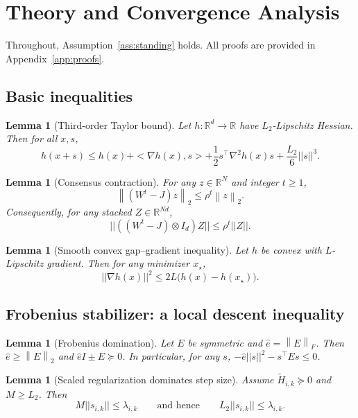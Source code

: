 \documentclass[11pt,a4paper]{article}
\def\one{1}%
\def\J{J}%
\def\norm#1{||#1||}%
\def\ip#1#2{<#1,#2>}%
\newtheorem{lemma}[theorem]{Lemma}
\newcommand{\R}{\mathbb{R}}
\newcommand{\one}{\mathbf{1}}
\newcommand{\ip}[2]{\left\langle #1,#2\right\rangle}
\newcommand{\norm}[1]{\left\|#1\right\|}
\newcommand{\normtwo}[1]{\left\|#1\right\|_2}
\newcommand{\normF}[1]{\left\|#1\right\|_F}
\newcommand{\J}{\left(\frac{1}{N}\one\one^\top\right)}
\begin{document}
	\section{Theory and Convergence Analysis}\label{sec:theory}
	Throughout, Assumption~\ref{ass:standing} holds.
	All proofs are provided in Appendix~\ref{app:proofs}.
	
	\subsection{Basic inequalities}
	\begin{lemma}[Third-order Taylor bound]\label{lem:taylor3}
		Let $h:\R^d\to\R$ have $L_2$-Lipschitz Hessian. Then for all $x,s$,
		\[
		h(x+s)\le h(x)+\ip{\nabla h(x)}{s}+\frac12 s^\top\nabla^2 h(x)s+\frac{L_2}{6}\norm{s}^3.
		\]
	\end{lemma}
	
	\begin{lemma}[Consensus contraction]\label{lem:consensus}
		For any $z\in\R^N$ and integer $t\ge 1$,
		\[
		\normtwo{(W^t-\J)z}\le \rho^t\normtwo{z}.
		\]
		Consequently, for any stacked $Z\in\R^{Nd}$,
		\[
		\norm{((W^t-\J)\otimes I_d)Z}\le \rho^t\norm{Z}.
		\]
	\end{lemma}
	
	\begin{lemma}[Smooth convex gap--gradient inequality]\label{lem:gap-grad}
		Let $h$ be convex with $L$-Lipschitz gradient. Then for any minimizer $x_\star$,
		\[
		\norm{\nabla h(x)}^2\le 2L\big(h(x)-h(x_\star)\big).
		\]
	\end{lemma}
	
	\subsection{Frobenius stabilizer: a local descent inequality}
	\begin{lemma}[Frobenius domination]\label{lem:frob}
		Let $E$ be symmetric and $\hat e=\normF{E}$. Then $\hat e\ge \normtwo{E}$ and $\hat e I\pm E\succeq 0$.
		In particular, for any $s$, $-\hat e\norm{s}^2-s^\top E s\le 0$.
	\end{lemma}
	
	\begin{lemma}[Scaled regularization dominates step size]\label{lem:M-vs-s}
		Assume $\tilde H_{i,k}\succeq 0$ and $M\ge L_2$. Then
		\[
		M\norm{s_{i,k}}\le \lambda_{i,k}
		\qquad\text{and hence}\qquad
		L_2\norm{s_{i,k}}\le \lambda_{i,k}.
		\]
	\end{lemma}
	
\end{document}
